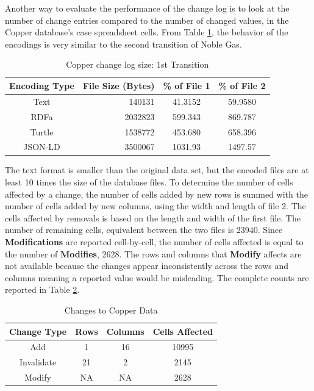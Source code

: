 Another way to evaluate the performance of the change log is to look at the number of change entries compared to the number of changed values, in the Copper database's case spreadsheet cells.
From Table \ref{table:Cu_changelog_table1}, the behavior of the encodings is very similar to the second transition of Noble Gas.
\begin{table}
	\caption{Copper change log size: 1st Transition}
	\label{table:Cu_changelog_table1}
	\centering
	\begin{tabular}{|c|r|c|c|}
		\hline
		Encoding Type & File Size (Bytes) & \% of File 1 & \% of File 2 \\
		\hline
		Text&	140131&	41.3152&	59.9580\\
		RDFa&	2032823&	599.343&	869.787\\
		Turtle&	1538772&	453.680&	658.396\\
		JSON-LD&	3500067&	1031.93&	1497.57\\
		\hline
	\end{tabular}
\end{table}
The text format is smaller than the original data set, but the encoded files are at least 10 times the size of the database files.
To determine the number of cells affected by a change, the number of cells added by new rows is summed with the number of cells added by new columns, using the width and length of file 2.
The cells affected by removals is based on the length and width of the first file.
The number of remaining cells, equivalent between the two files is 23940.
Since \textbf{Modifications} are reported cell-by-cell, the number of cells affected is equal to the number of \textbf{Modifies}, 2628.
The rows and columns that \textbf{Modify} affects are not available because the changes appear inconsistently across the rows and columns meaning a reported value would be misleading.
The complete counts are reported in Table \ref{table:Cu_cells}.
\begin{table}
	\caption{Changes to Copper Data}
	\label{table:Cu_cells}
	\centering
	\begin{tabular}{|c|c|c|c|}
		\hline
		Change Type&	Rows&	Columns&	Cells Affected\\ \hline
		Add&	1&	16&	10995\\
		Invalidate&	21&	2&	2145\\
		Modify&NA&NA& 2628\\
		\hline
	\end{tabular}
\end{table}

